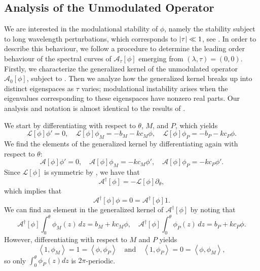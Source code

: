 \documentclass[11pt,leqno]{article}
\numberwithin{equation}{section}
\renewcommand\d{\partial}
\newcommand\LA{\left\langle}
\newcommand\RA{\right\rangle}
\theoremstyle{definition}
\begin{document}
\subsection{Analysis of the Unmodulated Operator}
We are interested in the modulational stability of $ \phi $, namely the stability subject to long wavelength perturbations, which corresponds to $ \abs{\tau}\ll 1$, see . In order to describe this behaviour, we follow a procedure to determine the leading order behaviour of the spectral curves of $ \mathcal{A}_{\tau}[\phi] $ emerging from $ (\lambda,\tau) = (0,0) $. Firstly, we characterize the generalized kernel of the unmodulated operator $ \mathcal{A}_{0}[\phi] $, subject to . Then we analyze how the generalized kernel breaks up into distinct eigenspaces as $ \tau $ varies; modulational instability arises when the eigenvalues corresponding to these eigenspaces have nonzero real parts. Our analysis and notation is almost identical to the results of \cite{BNR14,JP2020}.

We start by differentiating  with respect to $\theta$, $M$, and $P$, which yields
\begin{equation}\label{e:kernelelmts}
\mathcal{L}[\phi]\phi' = 0, \quad\mathcal{L}[\phi]\phi_M = -b_M - kc_M \phi, \quad \mathcal{L}[\phi]\phi_P = -b_P - kc_P \phi.
\end{equation}
We find the elements of the generalized kernel by differentiating again with respect to $ \theta $:
\begin{equation}\label{e:kernelelmts2}
\mathcal{A}[\phi]\phi'=0, \quad\mathcal{A}[\phi]\phi_M=-kc_M\phi', \quad\mathcal{A}[\phi]\phi_P=-kc_P\phi'.
\end{equation}
Since $ \mathcal{L}[\phi] $ is symmetric by , we have that
\[
\mathcal{A}^\dagger[\phi] = -\mathcal{L}[\phi]\d_\theta,
\]
which implies that
\begin{equation}\label{e:kernelelmts3}
\mathcal{A}^\dagger[\phi] \phi= 0 = \mathcal{A}^\dagger[\phi]1.
\end{equation}
We can find an element in the generalized kernel of $ \mathcal{A}^{\dagger}[\phi] $ by noting that
\[
\mathcal{A}^\dagger[\phi]\int_0^\theta \phi_M(z)\,dz = b_M +kc_M\phi,\quad\mathcal{A}^\dagger[\phi]\int_0^\theta \phi_P(z)\,dz = b_P +kc_P\phi.
\]
However, differentiating  with respect to $M$ and $P$ yields
\begin{equation}\label{e:innprod1}
    \LA 1, \phi_M\RA = 1 = \LA \phi, \phi_P\RA \quad\text{and}\quad \LA 1, \phi_P\RA = 0 = \LA \phi, \phi_M\RA,
\end{equation}
so only $\int_0^\theta \phi_P(z)dz$ is $2\pi$-periodic. 
\end{document}

